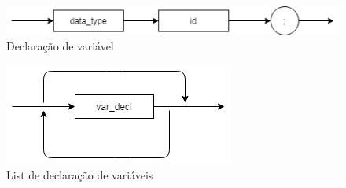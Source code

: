 \documentclass[]{article}
\numberwithin{equation}{section}
\begin{document}
\begin{center}
\begin{figure}[h!]
  \includegraphics[width=\linewidth]{./assets/var_decl.png}
  \caption{Declaração de variável}
\end{figure}
\end{center}

\begin{center}
\begin{figure}[h!]
  \includegraphics[width=\linewidth]{./assets/var_decl_list.png}
  \caption{List de declaração de variáveis}
\end{figure}
\end{center}
\end{document}
